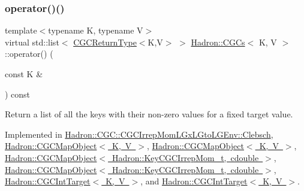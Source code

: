 \subsubsection{\texorpdfstring{operator()()}{operator()()}\hspace{0.1cm}{\footnotesize\ttfamily [3/4]}}
{\footnotesize\ttfamily template$<$typename K, typename V$>$ \\
virtual std\+::list$<$ \mbox{\hyperlink{structHadron_1_1CGCReturnType}{C\+G\+C\+Return\+Type}}$<$K,V$>$ $>$ \mbox{\hyperlink{classHadron_1_1CGCs}{Hadron\+::\+C\+G\+Cs}}$<$ K, V $>$\+::operator() (\begin{DoxyParamCaption}\item[{const K \&}]{ }\end{DoxyParamCaption}) const\hspace{0.3cm}{\ttfamily [pure virtual]}}



Return a list of all the keys with their non-\/zero values for a fixed target value. 



Implemented in \mbox{\hyperlink{classHadron_1_1CGC_1_1CGCIrrepMomLGxLGtoLGEnv_1_1Clebsch_a8a003db7855154fba35df2485da43353}{Hadron\+::\+C\+G\+C\+::\+C\+G\+C\+Irrep\+Mom\+L\+Gx\+L\+Gto\+L\+G\+Env\+::\+Clebsch}}, \mbox{\hyperlink{classHadron_1_1CGCMapObject_aeb342dc81f17743a25b969f540db4edf}{Hadron\+::\+C\+G\+C\+Map\+Object$<$ K, V $>$}}, \mbox{\hyperlink{classHadron_1_1CGCMapObject_aeb342dc81f17743a25b969f540db4edf}{Hadron\+::\+C\+G\+C\+Map\+Object$<$ K, V $>$}}, \mbox{\hyperlink{classHadron_1_1CGCMapObject_aeb342dc81f17743a25b969f540db4edf}{Hadron\+::\+C\+G\+C\+Map\+Object$<$ Hadron\+::\+Key\+C\+G\+C\+Irrep\+Mom\+\_\+t, cdouble $>$}}, \mbox{\hyperlink{classHadron_1_1CGCMapObject_aeb342dc81f17743a25b969f540db4edf}{Hadron\+::\+C\+G\+C\+Map\+Object$<$ Hadron\+::\+Key\+C\+G\+C\+Irrep\+Mom\+\_\+t, cdouble $>$}}, \mbox{\hyperlink{classHadron_1_1CGCIntTarget_a5946627ddb796961b97b7e0c57e32d83}{Hadron\+::\+C\+G\+C\+Int\+Target$<$ K, V $>$}}, and \mbox{\hyperlink{classHadron_1_1CGCIntTarget_a5946627ddb796961b97b7e0c57e32d83}{Hadron\+::\+C\+G\+C\+Int\+Target$<$ K, V $>$}}.

\mbox{\label{classHadron_1_1CGCs_a8d2d80be37b603359708ebdd5923ff47}} 
